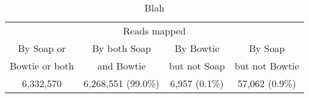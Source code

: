 \documentclass[letterpaper]{article}
\begin{document}
\begin{table}[tp]
\scriptsize
\begin{tabular}{cccc}
\multicolumn{4}{c}{Reads mapped} \\[3pt] 
By Soap or     & By both Soap & By Bowtie    & By Soap         \\ 
Bowtie or both & and Bowtie   & but not Soap & but not Bowtie \\ 
\toprule
6,332,570 & 6,268,551 (99.0\%) & 6,957 (0.1\%) & 57,062 (0.9\%) \\ 
\bottomrule
\end{tabular}
\caption{Blah}
\end{table}
\end{document}
